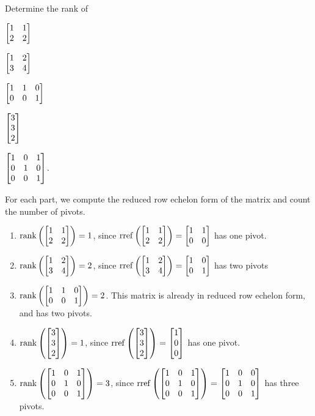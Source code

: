 \documentclass{problemset}
\begin{document}
	\begin{parts}
		\item Determine the rank of
		\begin{enumerate*}
			\item $\mat{1&1\\2&2}$
			\item $\mat{1&2\\3&4}$
			\item $\mat{1&1&0\\0&0&1}$
			\item $\mat{3\\3\\2}$
			\item $\mat{1&0&1\\0&1&0\\0&0&1}$.
		\end{enumerate*}
		\begin{solution}
			For each part, we compute the reduced row echelon form of the matrix
			and count the number of pivots.
			\begin{enumerate}
				\item $\Rank\left(\mat{1&1\\2&2}\right)=1$, since
					$\rref\left(\mat{1&1\\2&2}\right)=\mat{1&1\\0&0}$ has one pivot.
				\item $\Rank\left(\mat{1&2\\3&4}\right)=2$, since
					$\rref\left(\mat{1&2\\3&4}\right)=\mat{1&0\\0&1}$ has two pivots
				\item $\Rank\left(\mat{1&1&0\\0&0&1}\right)=2$.
					This matrix is already in reduced row echelon form, and has two pivots.
				\item $\Rank\left(\mat{3\\3\\2}\right)=1$, since
					$\rref\left(\mat{3\\3\\2}\right)=\mat{1\\0\\0}$ has one pivot.
				\item $\Rank\left(\mat{1&0&1\\0&1&0\\0&0&1}\right)=3$, since
					$\rref\left(\mat{1&0&1\\0&1&0\\0&0&1}\right)=\mat{1&0&0\\0&1&0\\0&0&1}$
					has three pivots.
			\end{enumerate}
		\end{solution}
	\end{parts}
\end{document}
